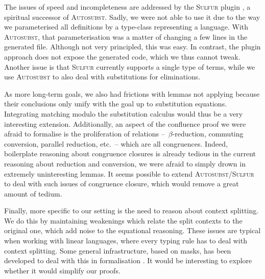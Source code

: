 \documentclass[a4paper,UKenglish,cleveref, autoref, thm-restate]{lipics-v2021}
\begin{document}
The issues of speed and incompleteness are addressed by the
\textsc{Sulfur} plugin \cite{BouverotDupuis2026}, a spiritual successor of
\textsc{Autosubst}. Sadly, we were not able to use it
due to the way we parameterised all definitions by a type-class
representing a language. With \textsc{Autosubst},
that parameterisation was a matter of changing a few lines in the
generated file. Although not very principled, this was easy. In contrast,
the plugin approach does not expose the generated code,
which we thus cannot tweak. Another issue
is that \textsc{Sulfur} currently supports a single type of terms, while
we use \textsc{Autosubst} to also deal with substitutions for eliminations.

As more long-term goals, we also had frictions with lemmas not applying
because their conclusions only unify with the goal up to
substitution equations. Integrating matching modulo the substitution calculus would
thus be a very interesting extension. Additionally, an aspect of the
confluence proof we were afraid to formalise is the proliferation of relations
--~\(\beta\)-reduction, commuting conversion, parallel reduction, etc.~--
which are all congruences. Indeed, boilerplate reasoning about congruence
closures is already tedious in the current reasoning about reduction and
conversion, we were afraid to simply drown in extremely uninteresting lemmas.
It seems possible to extend \textsc{Autosubst}/\textsc{Sulfur} to
deal with such issues of congruence closure, which would remove a great amount of tedium.


Finally, more specific to our setting is the need to reason about context splitting.
We do this by maintaining weakenings which relate the split contexts
to the original one, which add noise to the equational reasoning.
These issues are typical when working with linear languages, where
every typing rule has to deal with context splitting. Some general
infrastructure, based on masks, has been developed to
deal with this in formalisation \cite{Zackon2026}. It would be interesting to
explore whether it would simplify our proofs.
\end{document}
